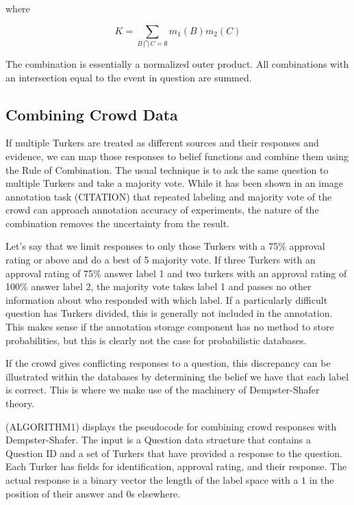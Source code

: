 where

\begin{equation*}
K=\sum_{B\bigcap C=\emptyset}m_{1}(B)m_{2}(C)
\end{equation*}

The combination is essentially a normalized outer product.  All combinations with an intersection equal to the event in question are summed.
 
\subsection{Combining Crowd Data}

If multiple Turkers are treated as different sources and their responses and evidence, we can map those responses to belief functions and combine them using the Rule of Combination.  The usual technique is to ask the same question to multiple Turkers and take a majority vote.  While it has been shown in an image annotation task (CITATION) that repeated labeling and majority vote of the crowd can approach annotation accuracy of experiments, the nature of the combination removes the uncertainty from the result.

Let's say that we limit responses to only those Turkers with a 75\% approval rating or above and do a best of 5 majority vote.  If three Turkers with an approval rating of 75\% answer label 1 and two turkers with an approval rating of 100\% answer label 2, the majority vote takes label 1 and passes no other information about who responded with which label.  If a particularly difficult question has Turkers divided, this is generally not included in the annotation.  This makes sense if the annotation storage component has no method to store probabilities, but this is clearly not the case for probabilistic databases.

If the crowd gives conflicting  responses to a question, this discrepancy can be illustrated within the databases by determining the belief we have that each label is correct.  This is where we make use of the machinery of Dempster-Shafer theory.

(ALGORITHM1) displays the pseudocode for combining crowd responses with Dempster-Shafer.  The input is a Question data structure that contains a Question ID and a set of Turkers that have provided a response to the question.  Each Turker has fields for identification, approval rating, and their response.  The actual response is a binary vector the length of the label space with a $1$ in the position of their answer and $0$s elsewhere.

